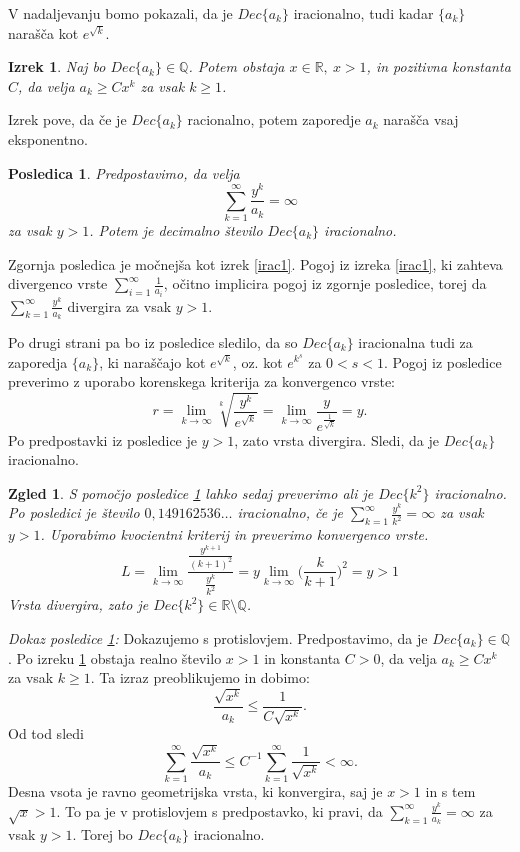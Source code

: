 \documentclass[a4paper,12pt]{article}
\def\Q{\mathbb{Q}} %
\def\R{\mathbb{R}} %
\newtheorem{izrek}{Izrek}
\newtheorem{posledica}{Posledica}
\newtheorem{zgled}{Zgled}
\begin{document}
V nadaljevanju bomo pokazali, da je $Dec\{a_k\}$ iracionalno, tudi kadar $\{a_k\}$ narašča kot $e^{\sqrt{k}}$.

\begin{izrek}
    \label{izrek1clanek2}
    Naj bo $Dec\{a_k\} \in \Q$. Potem obstaja $x \in \R, \ x > 1$, in pozitivna konstanta $C$,
    da velja $a_k \geq Cx^k$ za vsak $k \geq 1$.
\end{izrek}

Izrek pove, da če je $Dec\{a_k\}$ racionalno, potem zaporedje $a_k$ narašča vsaj eksponentno.

\begin{posledica}
    \label{posledica}
    Predpostavimo, da velja
    \[
        \sum_{k=1}^{\infty}\frac{y^k}{a_k} = \infty\]
    za vsak $y > 1$. Potem je decimalno število $Dec\{a_k\}$ iracionalno.
\end{posledica}

Zgornja posledica je močnejša kot izrek \ref{irac1}. 
Pogoj iz izreka \ref{irac1}, ki zahteva divergenco vrste
$\sum_{i=1}^{\infty} \frac{1}{a_i}$, očitno implicira
pogoj iz zgornje posledice, torej da $\sum_{k=1}^{\infty}\frac{y^k}{a_k}$
divergira za vsak $y > 1$.

Po drugi strani pa bo iz posledice sledilo, da so $Dec\{a_k\}$ iracionalna tudi za zaporedja
$\{a_k\}$, ki naraščajo kot $e^{\sqrt{k}}$, oz. kot $e^{k^s}$ za $0 < s < 1$. 
Pogoj iz posledice preverimo z uporabo korenskega kriterija za konvergenco vrste:
\[
    r = \lim_{k \rightarrow \infty}\sqrt[k]{\frac{y^k}{e^{\sqrt{k}}}} = \lim_{k \rightarrow \infty}\frac{y}{e^{\frac{1}{\sqrt{k}}}}
    = y.
\]
Po predpostavki iz posledice je $y > 1$, zato vrsta divergira. 
Sledi, da je $Dec\{a_k\}$ iracionalno.
\\

\begin{zgled}
    S pomočjo posledice \ref{posledica} lahko sedaj preverimo ali je $Dec\{k^2\}$ iracionalno.
    Po posledici je število $0,149162536\dots$ iracionalno, če je $\sum_{k=1}^{\infty}\frac{y^k}{k^2} = \infty$
    za vsak $y > 1$. Uporabimo kvocientni kriterij in preverimo konvergenco vrste.
    \[
        L = \lim_{k \rightarrow \infty} \frac{\frac{y^{k+1}}{(k+1)^2}}{\frac{y^k}{k^2}}
        = y \lim_{k \rightarrow \infty} \big (\frac{k}{k + 1}\big)^2 = y > 1
    \]
    Vrsta divergira, zato je $Dec\{k^2\} \in \R \setminus \Q$.
\end{zgled}

\noindent
{\em Dokaz posledice \ref{posledica}:\/}
Dokazujemo s protislovjem. Predpostavimo, da je $Dec\{a_k\} \in \Q$.
Po izreku \ref{izrek1clanek2} obstaja realno število $x > 1$ in konstanta $C>0$, da velja
$a_k \geq Cx^k$ za vsak $k \geq 1$. Ta izraz preoblikujemo in dobimo:
\[
    \frac{\sqrt{x^k}}{a_k} \leq \frac{1}{C\sqrt{x^k}}.\] 
Od tod sledi
\[ \sum_{k=1}^{\infty} \frac{\sqrt{x^k}}{a_k} \leq C^{-1} \sum_{k=1}^{\infty} \frac{1}{\sqrt{x^k}} < \infty.\]
Desna vsota je ravno geometrijska vrsta, ki konvergira, saj je $x > 1$ in s tem $\sqrt{x} > 1$.
To pa je v protislovjem s predpostavko, ki pravi, da $\sum_{k=1}^{\infty}\frac{y^k}{a_k} = \infty$ za vsak $y>1$.
Torej bo $Dec\{a_k\}$ iracionalno.
\end{document}
